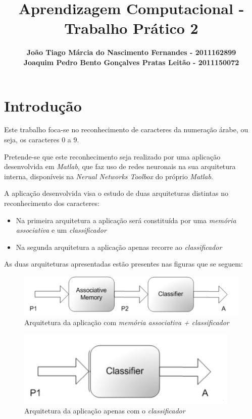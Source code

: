 \documentclass{article}
\title{\bf{Aprendizagem Computacional - Trabalho Prático 2}\vspace{80mm}}
\author{\textbf{João Tiago Márcia do Nascimento Fernandes - 2011162899} \\
\textbf{Joaquim Pedro Bento Gonçalves Pratas Leitão - 2011150072}}
\begin{document}
\maketitle

\pagebreak

\renewcommand*\contentsname{Índice}
\tableofcontents

\pagebreak

\section{Introdução}

Este trabalho foca-se no reconhecimento de caracteres da numeração árabe, ou seja, os caracteres 0 a 9.

Pretende-se que este reconhecimento seja realizado por uma aplicação desenvolvida em \emph{Matlab}, que faz uso de redes neuronais na sua arquitetura interna, disponíveis na \emph{Nerual Networks Toolbox} do próprio \emph{Matlab}.

A aplicação desenvolvida visa o estudo de duas arquiteturas distintas no reconhecimento dos caracteres:

\begin{itemize}
\item Na primeira arquitetura a aplicação será constituída por uma \emph{memória associativa} e um \emph{classificador}

\item Na segunda arquitetura a aplicação apenas recorre ao \emph{classificador}
\end{itemize}

\vspace{.3cm}

As duas arquiteturas apresentadas estão presentes nas figuras que se seguem:

\begin{figure}[h]
  \centering
      \includegraphics[scale=0.4]{AM_Classifier.png}
  \caption{Arquitetura da aplicação com \emph{memória associativa + classificador}}
\end{figure}

\begin{figure}[h]
  \centering
      \includegraphics[scale=0.4]{Classifier.png}
  \caption{Arquitetura da aplicação apenas com o \emph{classificador}}
\end{figure}
\end{document}
